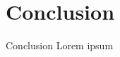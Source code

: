 \documentclass{beamer}
\theoremstyle{definition}
\begin{document}
  \section{Conclusion}
  \begin{frame}{Conclusion}
    Lorem ipsum
  \end{frame}
\end{document}
